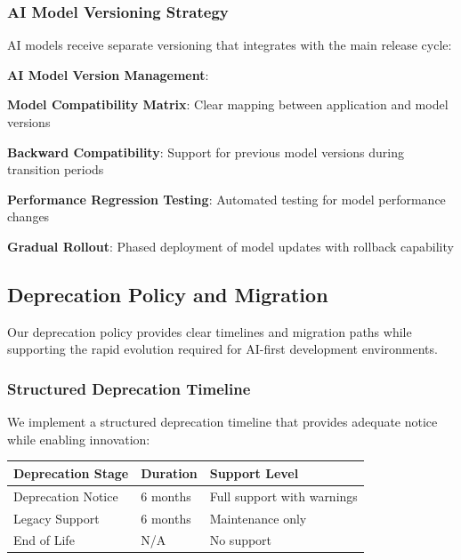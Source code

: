 \subsubsection*{AI Model Versioning Strategy}

AI models receive separate versioning that integrates with the main release cycle:

\begin{successbox}
\textbf{AI Model Version Management}:
\begin{compactlist}
    \item \textbf{Model Compatibility Matrix}: Clear mapping between application and model versions
    \item \textbf{Backward Compatibility}: Support for previous model versions during transition periods
    \item \textbf{Performance Regression Testing}: Automated testing for model performance changes
    \item \textbf{Gradual Rollout}: Phased deployment of model updates with rollback capability
\end{compactlist}
\end{successbox}

\subsection*{Deprecation Policy and Migration}

Our deprecation policy provides clear timelines and migration paths while supporting the rapid evolution required for AI-first development environments.

\subsubsection*{Structured Deprecation Timeline}

We implement a structured deprecation timeline that provides adequate notice while enabling innovation:

\begin{center}
\begin{tabular}{@{}lll@{}}
\toprule
\textbf{Deprecation Stage} & \textbf{Duration} & \textbf{Support Level} \\
\midrule
Deprecation Notice & 6 months & Full support with warnings \\
Legacy Support & 6 months & Maintenance only \\
End of Life & N/A & No support \\
\bottomrule
\end{tabular}
\end{center}

